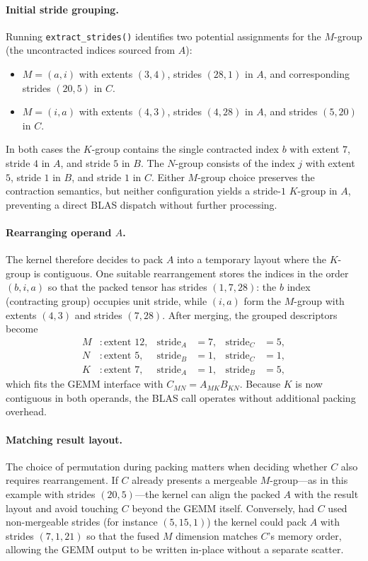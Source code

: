 \documentclass[11pt]{article}
\begin{document}
\paragraph{Initial stride grouping.}  Running \texttt{extract\_strides()} identifies two potential
assignments for the $M$-group (the uncontracted indices sourced from $A$):
\begin{itemize}
  \item $M = (a, i)$ with extents $(3, 4)$, strides $(28, 1)$ in $A$, and corresponding strides
        $(20, 5)$ in $C$.
  \item $M = (i, a)$ with extents $(4, 3)$, strides $(4, 28)$ in $A$, and strides $(5, 20)$ in $C$.
\end{itemize}
In both cases the $K$-group contains the single contracted index $b$ with extent $7$, stride $4$ in
$A$, and stride $5$ in $B$.  The $N$-group consists of the index $j$ with extent $5$, stride $1$ in
$B$, and stride $1$ in $C$.  Either $M$-group choice preserves the contraction semantics, but neither
configuration yields a stride-$1$ $K$-group in $A$, preventing a direct BLAS dispatch without further
processing.

\paragraph{Rearranging operand $A$.}  The kernel therefore decides to pack $A$ into a temporary
layout where the $K$-group is contiguous.  One suitable rearrangement stores the indices in the order
$(b, i, a)$ so that the packed tensor has strides $(1, 7, 28)$: the $b$ index (contracting group)
occupies unit stride, while $(i, a)$ form the $M$-group with extents $(4, 3)$ and strides $(7, 28)$.
After merging, the grouped descriptors become
\begin{align*}
  M &: \text{extent } 12, &\text{stride}_A &= 7, &\text{stride}_C &= 5, \\
  N &: \text{extent } 5,  &\text{stride}_B &= 1, &\text{stride}_C &= 1, \\
  K &: \text{extent } 7,  &\text{stride}_A &= 1, &\text{stride}_B &= 5,
\end{align*}
which fits the GEMM interface with $C_{MN} = A_{MK} B_{KN}$.  Because $K$ is now contiguous in both
operands, the BLAS call operates without additional packing overhead.

\paragraph{Matching result layout.}  The choice of permutation during packing matters when deciding
whether $C$ also requires rearrangement.  If $C$ already presents a mergeable $M$-group---as in
this example with strides $(20, 5)$---the kernel can align the packed $A$ with the result layout and
avoid touching $C$ beyond the GEMM itself.  Conversely, had $C$ used non-mergeable strides (for
instance $(5, 15, 1)$) the kernel could pack $A$ with strides $(7, 1, 21)$ so that the fused $M$
dimension matches $C$'s memory order, allowing the GEMM output to be written in-place without a
separate scatter.
\end{document}
